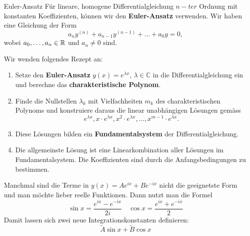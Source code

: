 \begin{Rezept}{Euler-Ansatz}{}
	Für lineare, homogene Differentialgleichung $n-ter$ Ordnung mit konstanten Koeffizienten, können wir den \textbf{Euler-Ansatz} verwenden. Wir haben eine Gleichung der Form
	\begin{equation*}
	a_n y^{(n)} + a_{n-1} y^{(n-1)} + \dots + a_0 y = 0,
	\end{equation*}
	wobei $a_0,\dots, a_n \in \mathbb{R}$ und $a_n\neq 0$ sind.
	
	Wir wenden folgendes Rezept an:
	\begin{enumerate}
		\item Setze den \textbf{Euler-Ansatz} $y(x) = e^{\lambda x}$, $\lambda \in\mathbb{C}$ in die Differentialgleichung ein und berechne das \textbf{charakteristische Polynom}.
		\item Finde die Nullstellen $\lambda_k$ mit Vielfachheiten $m_k$ des charakteristischen Polynoms und konstruiere daraus die linear unabhängigen Lösungen gemäss
		\begin{equation*}
		e^{\lambda x}, x \cdot e^{\lambda x}, x^2 \cdot e^{\lambda x}, \dots, x^{m-1} \cdot e^{\lambda x}.
		\end{equation*}
		\item Diese Lösungen bilden ein \textbf{Fundamentalsystem} der Differentialgleichung.
		\item Die allgemeinste Lösung ist eine Linearkombination aller Lösungen im Fundamentalsystem. Die Koeffizienten sind durch die Anfangsbedingungen zu bestimmen.
	\end{enumerate}
\end{Rezept}

\begin{Diverses}{}{}
	Manchmal sind die Terme in $y(x) = Ae^{ix} + Be^{-ix}$ nicht die geeignetste Form und man möchte lieber reelle Funktionen. Dann nutzt man die Formel 
	\[
		\sin x = \frac{e^{ix} - e^{-ix}}{2i} \quad
    	\cos x = \frac{e^{ix} + e^{-ix}}{2}
    \]
	Damit lassen sich zwei neue Integrationskonstanten definieren: \[\widetilde{A} \sin x + \widetilde{B} \cos x\]
\end{Diverses}


